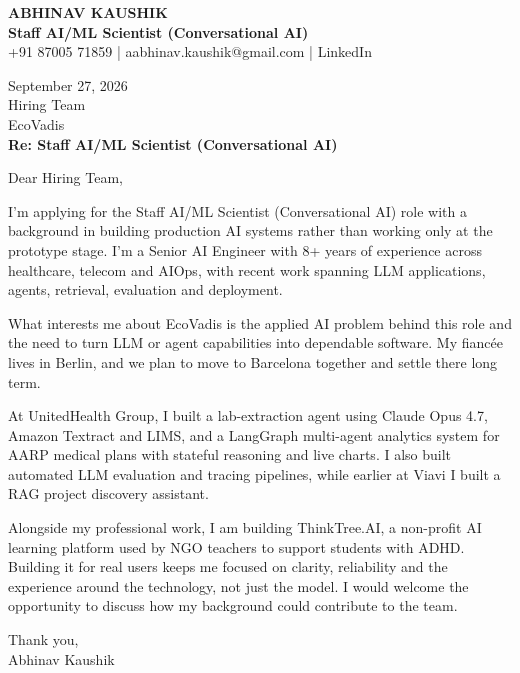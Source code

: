 \documentclass[10pt,a4paper]{article}
\begin{document}
\begin{center}
{\Large\bfseries ABHINAV KAUSHIK}\\[2pt]
{\bfseries Staff AI/ML Scientist (Conversational AI)}\\[2pt]
+91 87005 71859 \quad | \quad aabhinav.kaushik@gmail.com \quad | \quad LinkedIn
\end{center}
\vspace{8pt}
September 27, 2026\\[6pt]
Hiring Team\\
EcoVadis\\[4pt]
\textbf{Re: Staff AI/ML Scientist (Conversational AI)}

Dear Hiring Team,

I’m applying for the Staff AI/ML Scientist (Conversational AI) role with a background in building production AI systems rather than working only at the prototype stage. I’m a Senior AI Engineer with 8+ years of experience across healthcare, telecom and AIOps, with recent work spanning LLM applications, agents, retrieval, evaluation and deployment.

What interests me about EcoVadis is the applied AI problem behind this role and the need to turn LLM or agent capabilities into dependable software. My fiancée lives in Berlin, and we plan to move to Barcelona together and settle there long term.

At UnitedHealth Group, I built a lab-extraction agent using Claude Opus 4.7, Amazon Textract and LIMS, and a LangGraph multi-agent analytics system for AARP medical plans with stateful reasoning and live charts. I also built automated LLM evaluation and tracing pipelines, while earlier at Viavi I built a RAG project discovery assistant.

Alongside my professional work, I am building ThinkTree.AI, a non-profit AI learning platform used by NGO teachers to support students with ADHD. Building it for real users keeps me focused on clarity, reliability and the experience around the technology, not just the model. I would welcome the opportunity to discuss how my background could contribute to the team.

Thank you,\\
Abhinav Kaushik
\end{document}
